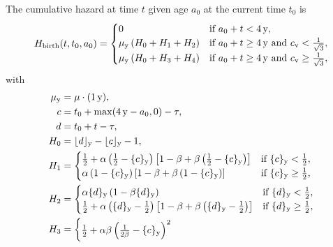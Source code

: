 \documentclass[12pt]{article}
\begin{document}
The cumulative hazard at time $t$ given age $a_0$ at the current
time $t_0$ is
\begin{equation}
  H_{\text{birth}}(t, t_0, a_0) =
  \begin{cases}
    0 & \text{if $a_0 + t < \unit[4]{y}$},
    \\
    \mu_{\mathrm{y}} \left(H_0 + H_1  + H_2\right)
    & \text{if $a_0 + t \geq \unit[4]{y}$
      and $c_{\text{v}} < \frac{1}{\sqrt{3}}$},
    \\
    \mu_{\mathrm{y}} \left(H_0 + H_3 + H_4\right)
    & \text{if $a_0 + t \geq \unit[4]{y}$
      and $c_{\text{v}} \geq \frac{1}{\sqrt{3}}$},
  \end{cases}
\end{equation}
with
\begin{equation}
  \begin{split}
    \mu_{\mathrm{y}} &= \mu \cdot (\unit[1]{y}),
    \\
    c &= t_0 + \max(\unit[4]{y} - a_0, 0) - \tau,
    \\
    d &= t_0 + t - \tau,
    \\
    H_0 &= \lfloor d \rfloor_{\mathrm{y}} - \lfloor c \rfloor_{\mathrm{y}} - 1,
    \\
    H_1 &=
    \begin{cases}
      \frac{1}{2}
      + \alpha \left(\frac{1}{2} - \{c\}_{\mathrm{y}}\right)
      \left[1 - \beta
        + \beta \left(\frac{1}{2} - \{c\}_{\mathrm{y}}\right)\right]
      & \text{if $\{c\}_{\mathrm{y}} < \frac{1}{2}$},
      \\
      \alpha \left(1 - \{c\}_{\mathrm{y}}\right)
      \left[1 - \beta + \beta \left(1 - \{c\}_{\mathrm{y}}\right)\right]
      & \text{if $\{c\}_{\mathrm{y}} \geq \frac{1}{2}$},
    \end{cases}
    \\
    H_2 &=
    \begin{cases}
      \alpha \{d\}_{\mathrm{y}}\left(1 - \beta \{d\}_{\mathrm{y}}\right)
      & \text{if $\{d\}_{\mathrm{y}} < \frac{1}{2}$},
      \\
      \frac{1}{2}
      + \alpha \left(\{d\}_{\mathrm{y}} - \frac{1}{2}\right)
      \left[1 - \beta
        + \beta \left(\{d\}_{\mathrm{y}} - \frac{1}{2}\right)\right]
      & \text{if $\{d\}_{\mathrm{y}} \geq \frac{1}{2}$},
    \end{cases}
    \\
    H_3 &=
    \begin{cases}
      \frac{1}{2} + \alpha \beta \left(\frac{1}{2 \beta} - \{c\}_{\mathrm{y}}\right)^2

\end{cases}
\end{split}
\end{equation}
\end{document}
